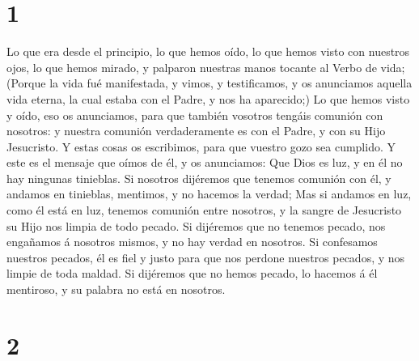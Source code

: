 \hypertarget{section}{%
\section{1}\label{section}}

 Lo que era desde el principio, lo que hemos oído, lo que
hemos visto con nuestros ojos, lo que hemos mirado, y palparon nuestras
manos tocante al Verbo de vida;  (Porque la vida fué
manifestada, y vimos, y testificamos, y os anunciamos aquella vida
eterna, la cual estaba con el Padre, y nos ha aparecido;) 
Lo que hemos visto y oído, eso os anunciamos, para que también vosotros
tengáis comunión con nosotros: y nuestra comunión verdaderamente es con
el Padre, y con su Hijo Jesucristo.  Y estas cosas os
escribimos, para que vuestro gozo sea cumplido.  Y este es
el mensaje que oímos de él, y os anunciamos: Que Dios es luz, y en él no
hay ningunas tinieblas.  Si nosotros dijéremos que tenemos
comunión con él, y andamos en tinieblas, mentimos, y no hacemos la
verdad;  Mas si andamos en luz, como él está en luz, tenemos
comunión entre nosotros, y la sangre de Jesucristo su Hijo nos limpia de
todo pecado.  Si dijéremos que no tenemos pecado, nos
engañamos á nosotros mismos, y no hay verdad en nosotros. 
Si confesamos nuestros pecados, él es fiel y justo para que nos perdone
nuestros pecados, y nos limpie de toda maldad.  Si
dijéremos que no hemos pecado, lo hacemos á él mentiroso, y su palabra
no está en nosotros.

\hypertarget{section-1}{%
\section{2}\label{section-1}}

